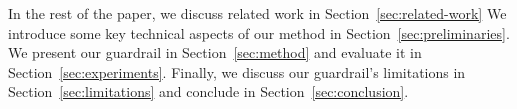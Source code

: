 
In the rest of the paper, we discuss related work in Section~\ref{sec:related-work}
We introduce some key technical aspects of our method in Section~\ref{sec:preliminaries}.
We present our guardrail in Section~\ref{sec:method} and evaluate it in Section~\ref{sec:experiments}.
Finally, we discuss our guardrail's limitations in Section~\ref{sec:limitations} and conclude in Section~\ref{sec:conclusion}.

